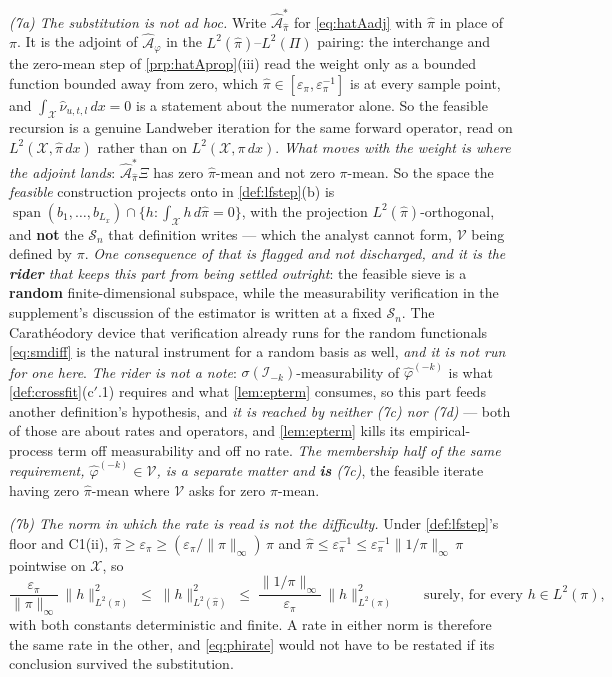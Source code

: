 \begin{remark}
\emph{(7a) The substitution is not ad hoc.} Write $\hat{\mathcal A}^\ast_{\hat\pi}$ for
\eqref{eq:hatAadj} with $\hat\pi$ in place of $\pi$. It is the adjoint of
$\hat{\mathcal A}_\varphi$ in the $L^{2}(\hat\pi)$--$L^{2}(\Pi)$ pairing: the interchange and the
zero-mean step of \cref{prp:hatAprop}\textup{(iii)} read the weight only as a bounded function bounded
away from zero, which $\hat\pi\in[\varepsilon_\pi,\varepsilon_\pi^{-1}]$ is at every sample point, and
$\int_{\mathcal X}\hat\nu_{u,t,l}\,dx=0$ is a statement about the numerator alone. So the feasible
recursion is a genuine Landweber iteration for the same forward operator, read on
$L^{2}(\mathcal X,\hat\pi\,dx)$ rather than on $L^{2}(\mathcal X,\pi\,dx)$. \emph{What moves with the
weight is where the adjoint lands}: $\hat{\mathcal A}^\ast_{\hat\pi}\Xi$ has zero $\hat\pi$-mean and not
zero $\pi$-mean. So the space the \emph{feasible} construction projects onto in
\cref{def:lfstep}\textup{(b)} is
$\operatorname{span}(b_1,\dots,b_{L_x})\cap\{h:\int_{\mathcal X} h\,d\hat\pi=0\}$, with the projection
$L^{2}(\hat\pi)$-orthogonal, and \textbf{not} the $\mathcal S_n$ that definition writes --- which the
analyst cannot form, $\mathcal V$ being defined by $\pi$. \emph{One consequence of that is flagged and
not discharged, and it is the \textbf{rider} that keeps this part from being settled outright}: the
feasible sieve is a \textbf{random} finite-dimensional subspace, while the
measurability verification in the supplement's discussion of the estimator is written at a fixed
$\mathcal S_n$. The Carath\'eodory device that verification already runs for the random functionals
\eqref{eq:smdiff} is the natural instrument for a random basis as well, \emph{and it is not run for one
here}. \emph{The rider is not a note}: $\sigma(\mathcal I_{-k})$-measurability of
$\hat\varphi^{(-k)}$ is what \cref{def:crossfit}\textup{(c$'$.1)} requires and what
\cref{lem:epterm} consumes, so this part feeds another definition's hypothesis, and \emph{it is
reached by neither \textup{(7c)} nor \textup{(7d)}} --- both of those are about rates and operators,
and \cref{lem:epterm} kills its empirical-process term off measurability and off no rate. \emph{The
membership half of the same requirement, $\hat\varphi^{(-k)}\in\mathcal V$, is a separate matter and
\textbf{is} \textup{(7c)}}, the feasible iterate having zero $\hat\pi$-mean where $\mathcal V$ asks for
zero $\pi$-mean.

\emph{(7b) The norm in which the rate is read is not the difficulty.} Under \cref{def:lfstep}'s floor and
C1(ii), $\hat\pi\ge\varepsilon_\pi\ge(\varepsilon_\pi/\|\pi\|_\infty)\,\pi$ and
$\hat\pi\le\varepsilon_\pi^{-1}\le\varepsilon_\pi^{-1}\|1/\pi\|_\infty\,\pi$ pointwise on $\mathcal X$,
so
\[
\frac{\varepsilon_\pi}{\|\pi\|_\infty}\,\|h\|^{2}_{L^{2}(\pi)}
\;\le\;\|h\|^{2}_{L^{2}(\hat\pi)}\;\le\;
\frac{\|1/\pi\|_\infty}{\varepsilon_\pi}\,\|h\|^{2}_{L^{2}(\pi)}
\qquad\text{surely, for every }h\in L^{2}(\pi),
\]
with both constants deterministic and finite. A rate in either norm is therefore the same rate in the
other, and \eqref{eq:phirate} would not have to be restated if its conclusion survived the substitution.


\end{remark}
